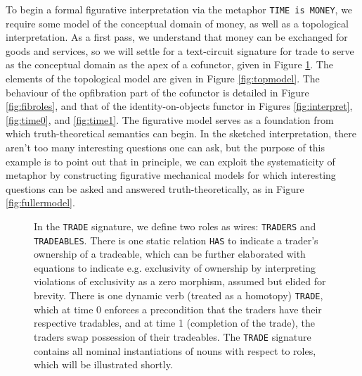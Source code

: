 \begin{example}
To begin a formal figurative interpretation via the metaphor \texttt{TIME is MONEY}, we require some model of the conceptual domain of money, as well as a topological interpretation. As a first pass, we understand that money can be exchanged for goods and services, so we will settle for a text-circuit signature for trade to serve as the conceptual domain as the apex of a cofunctor, given in Figure \ref{fig:tradesig}. The elements of the topological model are given in Figure \ref{fig:topmodel}. The behaviour of the opfibration part of the cofunctor is detailed in Figure \ref{fig:fibroles}, and that of the identity-on-objects functor in Figures \ref{fig:interpret}, \ref{fig:time0}, and \ref{fig:time1}. The figurative model serves as a foundation from which truth-theoretical semantics can begin. In the sketched interpretation, there aren't too many interesting questions one can ask, but the purpose of this example is to point out that in principle, we can exploit the systematicity of metaphor by constructing figurative mechanical models for which interesting questions can be asked and answered truth-theoretically, as in Figure \ref{fig:fullermodel}.
\begin{figure}[h]\label{fig:tradesig}
\centering
{}
\caption{In the \texttt{TRADE} signature, we define two roles as wires: \texttt{TRADERS} and \texttt{TRADEABLES}. There is one static relation \texttt{HAS} to indicate a trader's ownership of a tradeable, which can be further elaborated with equations to indicate e.g. exclusivity of ownership by interpreting violations of exclusivity as a zero morphism, assumed but elided for brevity. There is one dynamic verb (treated as a homotopy) \texttt{TRADE}, which at time 0 enforces a precondition that the traders have their respective tradables, and at time 1 (completion of the trade), the traders swap possession of their tradeables. The \texttt{TRADE} signature contains all nominal instantiations of nouns with respect to roles, which will be illustrated shortly.}

\end{figure}
\end{example}
